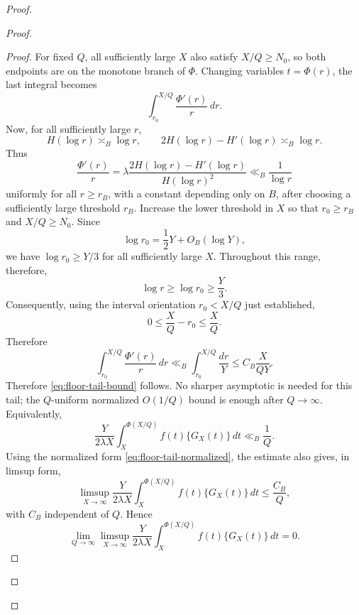 \documentclass[11pt]{article}
\begin{document}
\begin{proof}
\begin{proof}
\begin{proof}
For fixed $Q$, all sufficiently large $X$ also satisfy $X/Q\ge N_0$, so both endpoints are on
the monotone branch of $\Phi$. Changing variables $t=\Phi(r)$, the last integral becomes
\[
\int_{r_0}^{X/Q}\frac{\Phi'(r)}r\,dr.
\]
Now, for all sufficiently large $r$,
\[
H(\log r)\asymp_B\log r,
\qquad
2H(\log r)-H'(\log r)\asymp_B\log r.
\]
Thus
\[
\frac{\Phi'(r)}r
=
\lambda\frac{2H(\log r)-H'(\log r)}{H(\log r)^2}
\ll_B
\frac1{\log r}
\]
uniformly for all $r\ge r_B$, with a constant depending only on $B$, after choosing a sufficiently
large threshold $r_B$. Increase the lower threshold in $X$ so that $r_0\ge r_B$ and
$X/Q\ge N_0$. Since
\[
\log r_0=\frac12Y+O_B(\log Y),
\]
we have $\log r_0\ge Y/3$ for all sufficiently large $X$. Throughout this range, therefore,
\[
\log r\ge\log r_0\ge \frac Y3.
\]
Consequently, using the interval orientation $r_0<X/Q$ just established,
\[
0\le \frac XQ-r_0\le \frac XQ.
\]
Therefore
\[
\int_{r_0}^{X/Q}\frac{\Phi'(r)}r\,dr
\ll_B
\int_{r_0}^{X/Q}\frac{dr}{Y}
\le
C_B\frac{X}{QY}.
\]
Therefore \eqref{eq:floor-tail-bound} follows. No sharper asymptotic is needed for this tail; the
$Q$-uniform normalized $O(1/Q)$ bound is enough after $Q\to\infty$. Equivalently,
\[
\frac{Y}{2\lambda X}
\int_X^{\Phi(X/Q)} f(t)\{G_X(t)\}\,dt
\ll_B
\frac1Q.
\tag{40}\label{eq:floor-tail-normalized}
\]
Using the normalized form \eqref{eq:floor-tail-normalized}, the estimate also gives, in
limsup form,
\[
\limsup_{X\to\infty}
\frac{Y}{2\lambda X}
\int_X^{\Phi(X/Q)} f(t)\{G_X(t)\}\,dt
\le
\frac{C_B}{Q},
\]
with $C_B$ independent of $Q$. Hence
\[
\lim_{Q\to\infty}\limsup_{X\to\infty}
\frac{Y}{2\lambda X}
\int_X^{\Phi(X/Q)} f(t)\{G_X(t)\}\,dt=0.
\]
\end{proof}


\end{proof}
\end{proof}
\end{document}

